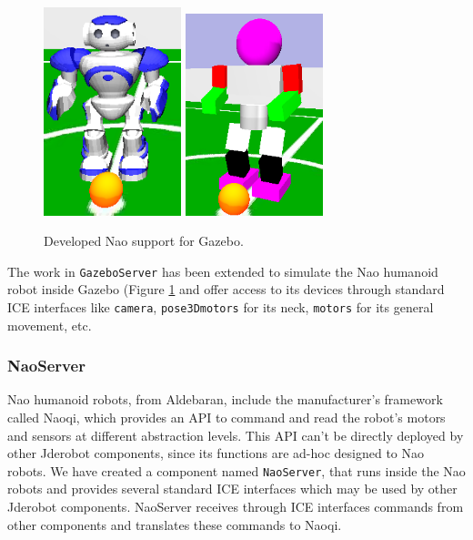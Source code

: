 \documentclass[twocolumn]{svjour3}          %
\begin{document}
\begin{figure}[h!]
  \includegraphics[width=4cm]{figs/nao_piel.png}
  \includegraphics[width=4cm]{figs/nao_sinPiel.png}
\caption{Developed Nao support for Gazebo.}
\label{fig:naogazebo}
\end{figure}

The work in \texttt{GazeboServer} has been extended to simulate the Nao humanoid robot inside Gazebo (Figure \ref{fig:naogazebo} and offer access to its devices through standard ICE interfaces like \texttt{camera}, \texttt{pose3Dmotors} for its neck, \texttt{motors} for its general movement, etc.

\subsubsection{NaoServer}

Nao humanoid robots, from Aldebaran, include the manufacturer's framework called Naoqi, which provides an API to command and read the robot's motors and sensors at different abstraction levels. This API can't be directly deployed by other Jderobot components, since its functions are ad-hoc designed to Nao robots. We have created a component named \texttt{NaoServer}, that runs inside the Nao robots and provides several standard ICE interfaces which may be used by other Jderobot components. NaoServer receives through ICE interfaces commands from other components and translates these commands to Naoqi.
\end{document}
